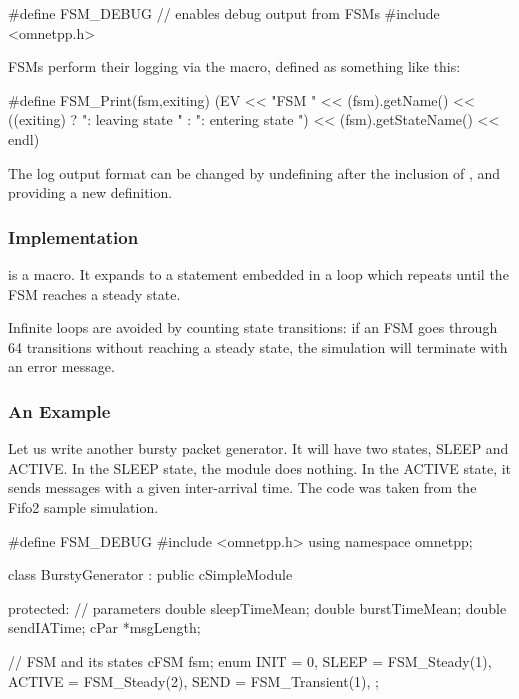 \begin{ned}
\begin{cpp}
#define FSM_DEBUG    // enables debug output from FSMs
#include <omnetpp.h>
\end{cpp}

FSMs perform their logging via the  macro, defined as
something like this:

\begin{cpp}
#define FSM_Print(fsm,exiting)
  (EV << "FSM " << (fsm).getName()
      << ((exiting) ? ": leaving state " : ": entering state ")
      << (fsm).getStateName() << endl)
\end{cpp}

The log output format can be changed by undefining  after the
inclusion of , and providing a new definition.


\subsubsection{Implementation}
\label{sec:simple-modules:fsm-implementation}

 is a macro. It expands to a 
statement embedded in a  loop which repeats until the
FSM reaches a steady state.

Infinite loops are avoided by counting state transitions: if
an FSM goes through 64 transitions without reaching a steady
state, the simulation will terminate with an error message.


\subsubsection{An Example}
\label{sec:simple-modules:fsm-example}

Let us write another bursty packet generator. It will have two
states, SLEEP and ACTIVE. In the SLEEP state, the module does
nothing. In the ACTIVE state, it sends messages with a given
inter-arrival time. The code was taken from the Fifo2 sample
simulation.


\begin{cpp}
#define FSM_DEBUG
#include <omnetpp.h>
using namespace omnetpp;

class BurstyGenerator : public cSimpleModule
{
  protected:
    // parameters
    double sleepTimeMean;
    double burstTimeMean;
    double sendIATime;
    cPar *msgLength;

    // FSM and its states
    cFSM fsm;
    enum {
      INIT = 0,
      SLEEP = FSM_Steady(1),
      ACTIVE = FSM_Steady(2),
      SEND = FSM_Transient(1),
    };

}
\end{cpp}
\end{ned}
